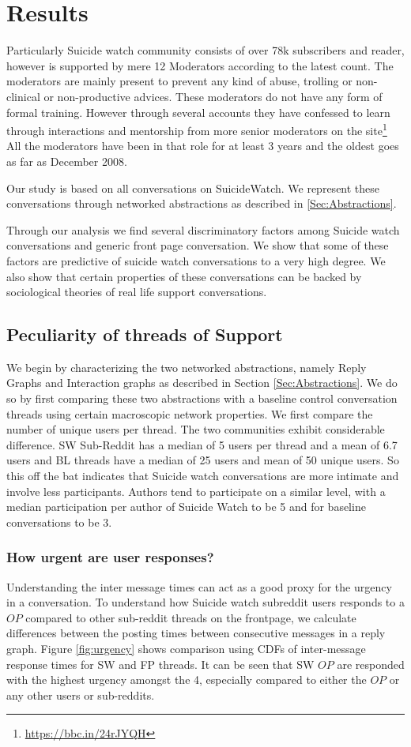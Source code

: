\section{Results}
Particularly Suicide watch community consists of over 78k subscribers and reader, however is supported by mere 12 Moderators according to the latest count. The moderators are mainly present to prevent any kind of abuse, trolling or non-clinical or non-productive advices. These moderators do not have any form of formal training. However through several accounts they have confessed to learn through interactions and mentorship from more senior moderators on the site\footnote{\url{https://bbc.in/24rJYQH}} All the moderators have been in that role for at least 3 years and the oldest goes as far as December 2008. 

Our study is based on all conversations on SuicideWatch.
We represent these conversations through networked abstractions as described in \ref{Sec:Abstractions}.

Through our analysis we find several discriminatory factors among Suicide watch conversations and generic front page conversation. We show that some of these factors are predictive of suicide watch conversations to a very high degree. We also show that certain properties of these conversations can be backed by sociological theories of real life support conversations. 

\subsection{Peculiarity of threads of Support}
We begin by characterizing the two networked abstractions, namely Reply Graphs and Interaction graphs as described in Section \ref{Sec:Abstractions}. 
We do so by first comparing these two abstractions with a baseline control conversation threads using certain macroscopic network properties. 
We first compare the number of unique users per thread. The two communities exhibit considerable difference. SW Sub-Reddit has a median of 5 users per thread and a mean of 6.7 users and BL threads have a median of 25 users and mean of 50 unique users. So this off the bat indicates that Suicide watch conversations are more intimate and involve less participants. Authors tend to participate on a similar level, with a median participation per author of Suicide Watch to be 5 and for baseline conversations to be 3.

\subsubsection{How urgent are user responses?}
Understanding the inter message times can act as a good proxy for the urgency in a conversation. To understand how Suicide watch subreddit users responds to a $OP$ compared to other sub-reddit threads on the frontpage, we calculate differences between the posting times between consecutive messages in a reply graph. Figure \ref{fig:urgency} shows comparison using CDFs of inter-message response times for SW and FP threads. It can be seen that SW $OP$ are responded with the highest urgency amongst the 4, especially compared to either the $OP$ or any other users or sub-reddits. 

